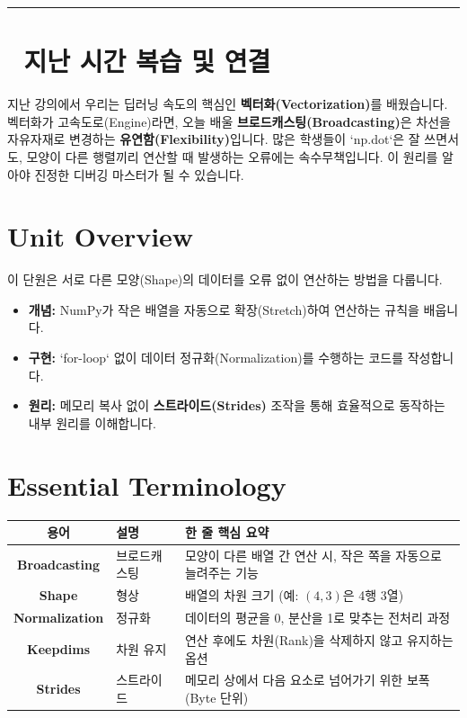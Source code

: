 \documentclass[11pt,a4paper]{book}
\theoremstyle{definition}
\begin{document}
\vspace{0.5cm}
\hrule
\vspace{0.5cm}

\section*{🔗 지난 시간 복습 및 연결}
지난 강의에서 우리는 딥러닝 속도의 핵심인 \textbf{벡터화(Vectorization)}를 배웠습니다. 벡터화가 고속도로(Engine)라면, 오늘 배울 \textbf{브로드캐스팅(Broadcasting)}은 차선을 자유자재로 변경하는 \textbf{유연함(Flexibility)}입니다. 많은 학생들이 `np.dot`은 잘 쓰면서도, 모양이 다른 행렬끼리 연산할 때 발생하는 오류에는 속수무책입니다. 이 원리를 알아야 진정한 디버깅 마스터가 될 수 있습니다.

\section{Unit Overview}
\begin{summarybox}[title={핵심 목표}]
이 단원은 서로 다른 모양(Shape)의 데이터를 오류 없이 연산하는 방법을 다룹니다.
\begin{itemize}
    \item \textbf{개념:} NumPy가 작은 배열을 자동으로 확장(Stretch)하여 연산하는 규칙을 배웁니다.
    \item \textbf{구현:} `for-loop` 없이 데이터 정규화(Normalization)를 수행하는 코드를 작성합니다.
    \item \textbf{원리:} 메모리 복사 없이 \textbf{스트라이드(Strides)} 조작을 통해 효율적으로 동작하는 내부 원리를 이해합니다.
\end{itemize}
\end{summarybox}

\section{Essential Terminology}
\begin{center}
\begin{tabular}{|c|l|l|}
\hline
\textbf{용어} & \textbf{설명} & \textbf{한 줄 핵심 요약} \\ \hline
\textbf{Broadcasting} & 브로드캐스팅 & 모양이 다른 배열 간 연산 시, 작은 쪽을 자동으로 늘려주는 기능 \\ \hline
\textbf{Shape} & 형상 & 배열의 차원 크기 (예: $(4, 3)$은 4행 3열) \\ \hline
\textbf{Normalization} & 정규화 & 데이터의 평균을 0, 분산을 1로 맞추는 전처리 과정 \\ \hline
\textbf{Keepdims} & 차원 유지 & 연산 후에도 차원(Rank)을 삭제하지 않고 유지하는 옵션 \\ \hline
\textbf{Strides} & 스트라이드 & 메모리 상에서 다음 요소로 넘어가기 위한 보폭 (Byte 단위) \\ \hline
\end{tabular}
\end{center}
\end{document}
